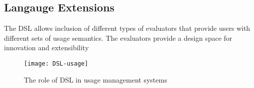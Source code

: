 \subsection{Langauge Extensions}

The DSL allows inclusion of different types of evaluators that provide users with different sets of usage semantics. The evaluators provide a design space for innovation and extensibility



\begin{figure}[!t]
\centering
\texttt{[image: DSL-usage]}
\caption{The role of DSL in usage management systems}
\label{fig:DSL-usage}
\end{figure}